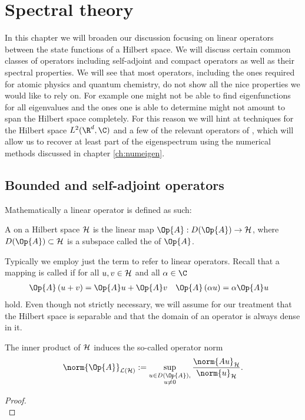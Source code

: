 \section{Spectral theory}
\label{sec:spectral}

In this chapter we will broaden our discussion focusing
on linear operators between the state functions of a Hilbert space.
We will discuss certain common classes of operators
including self-adjoint and compact operators as well as their spectral properties.
We will see that most operators, including the ones required for
atomic physics and quantum chemistry,
do not show all the nice properties we would like to rely on.
For example one might not be able to find eigenfunctions
for all eigenvalues and the ones one is able to determine
might not amount to span the Hilbert space completely.
For this reason we will hint at techniques for the Hilbert space
$L^2(\R^d, \C)$ and a few of the relevant operators of \QM,
which will allow us to recover at least part of the eigenspectrum
using the numerical methods discussed in chapter \vref{ch:numeigen}.

\subsection{Bounded and self-adjoint operators}

Mathematically a linear operator is defined as such:
\begin{defn}
	A  on a Hilbert space $\mathcal{H}$
	is the linear map $\Op{A} : D(\Op{A}) \to \hilbert$,
	where $D(\Op{A}) \subset \hilbert$ is a subspace
	called the  of $\Op{A}$.
\end{defn}
Typically we employ just the term  to refer to linear operators.
Recall that a mapping is called  if 
for all $u, v \in \mathcal{H}$ and all $\alpha \in \C$
\begin{align}
	\label{eqn:OperatorLinear}
	\Op{A}\left(u + v\right) &= \Op{A}u + \Op{A}v &
	\Op{A}\left(\alpha u\right) &= \alpha \Op{A}u
\end{align}
hold.
Even though not strictly necessary, we will assume for our treatment
that the Hilbert space is separable and that the domain of an operator
is always dense in it.

\newcommand{\opnorm}[1]{\norm{#1}_{\mathcal{L}(\hilbert)}}
\begin{prop}
	The inner product of $\mathcal{H}$ induces the so-called operator norm
	\[ \opnorm{\Op{A}} := \sup_{\substack{u \in D(\Op{A}),\\ u\neq0}}
		\frac{\norm{A u}_\hilbert}{\norm{u}_{\hilbert}}. \]
	\begin{proof}
		~ \\
	\end{proof}
\end{prop}

